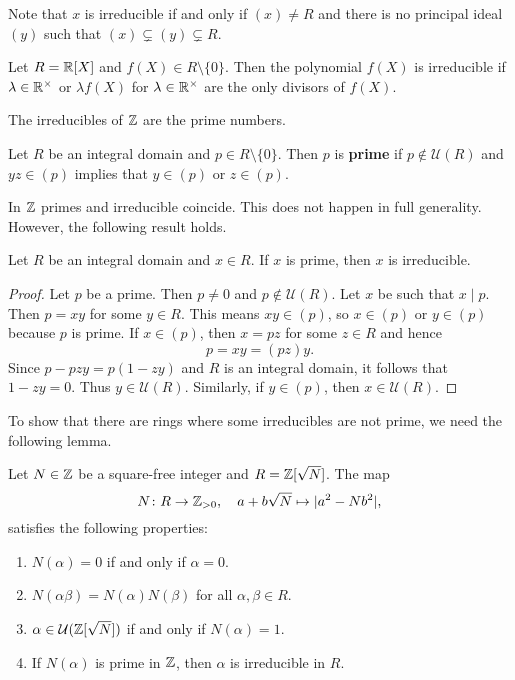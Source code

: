 Note that $x$ is irreducible if and only if $(x)\ne R$ 
and there is no principal ideal $(y)$ such that 
$(x)\subsetneq (y)\subsetneq R$.

\begin{example}
	Let $R=\mathbb{R}[X]$ and $f(X)\in R\setminus\{0\}$. Then the polynomial $f(X)$ is irreducible if 
	$\lambda\in\mathbb{R}^{\times}$ or $\lambda f(X)$ for $\lambda\in\mathbb{R}^{\times}$ 
	are the only divisors
	of $f(X)$.  
\end{example}

The irreducibles of $\mathbb{Z}$ are the prime numbers. 

\begin{definition}
	Let $R$ be an integral domain and $p\in R\setminus\{0\}$. Then  
	$p$ is \textbf{prime} if $p\not\in\mathcal{U}(R)$ and 
	$yz\in (p)$ implies that $y\in (p)$ or $z\in (p)$. 
\end{definition}

In $\mathbb{Z}$ primes and irreducible coincide. This does not happen in full generality. However,
the following result holds. 

\begin{proposition}
	Let $R$ be an integral domain and $x\in R$. 
	If $x$ is prime, then $x$ is irreducible. 
\end{proposition}

\begin{proof}
	Let $p$ be a prime. Then $p\ne 0$ and $p\not\in\mathcal{U}(R)$. Let $x$ be such that
	$x\mid p$. Then $p=xy$ for some $y\in R$. This means $xy\in (p)$, 
	so $x\in (p)$ or $y\in (p)$ because
	$p$ is prime. If $x\in (p)$, then $x=pz$ for some $z\in R$ and hence
	\[
	p=xy=(pz)y.
	\]
	Since $p-pzy=p(1-zy)$ and $R$ is an integral domain, it follows that 
	$1-zy=0$. Thus $y\in\mathcal{U}(R)$. Similarly, if $y\in (p)$, then 
	$x\in\mathcal{U}(R)$. 
\end{proof}

To show that there are rings where some irreducibles are not prime, 
we need the following lemma. 

\begin{lemma}
Let $N\in\mathbb{Z}$ be a square-free integer and $R=\mathbb{Z}[\sqrt{N}]$. The map 
\[
	N\colon R\to\mathbb{Z}_{>0},
\quad a+b\sqrt{N}\mapsto 
|a^2-Nb^2|,
\]
satisfies the following properties:
\begin{enumerate}
	\item $N(\alpha)=0$ if and only if $\alpha=0$. 
	\item $N(\alpha\beta)=N(\alpha)N(\beta)$ for all $\alpha,\beta\in R$. 
	\item $\alpha\in\mathcal{U}(\mathbb{Z}[\sqrt{N}])$ if and only if $N(\alpha)=1$. 
	\item If $N(\alpha)$ is prime in $\mathbb{Z}$, then $\alpha$ is irreducible in $R$. 
\end{enumerate}	
\end{lemma}

